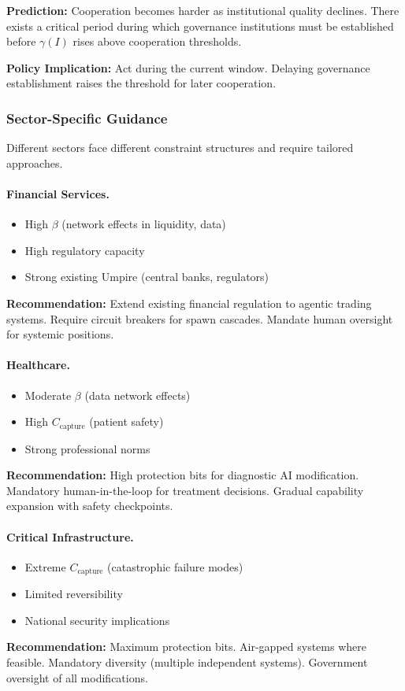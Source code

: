 \documentclass[12pt]{article}
\begin{document}
\textbf{Prediction:} Cooperation becomes harder as institutional quality declines. There exists a critical period during which governance institutions must be established before $\gamma(I)$ rises above cooperation thresholds.

\textbf{Policy Implication:} Act during the current window. Delaying governance establishment raises the threshold for later cooperation.

\subsubsection{Sector-Specific Guidance}

Different sectors face different constraint structures and require tailored approaches.

\paragraph{Financial Services.}
\begin{itemize}
    \item High $\beta$ (network effects in liquidity, data)
    \item High regulatory capacity
    \item Strong existing Umpire (central banks, regulators)
\end{itemize}
\textbf{Recommendation:} Extend existing financial regulation to agentic trading systems. Require circuit breakers for spawn cascades. Mandate human oversight for systemic positions.

\paragraph{Healthcare.}
\begin{itemize}
    \item Moderate $\beta$ (data network effects)
    \item High $C_{\text{capture}}$ (patient safety)
    \item Strong professional norms
\end{itemize}
\textbf{Recommendation:} High protection bits for diagnostic AI modification. Mandatory human-in-the-loop for treatment decisions. Gradual capability expansion with safety checkpoints.

\paragraph{Critical Infrastructure.}
\begin{itemize}
    \item Extreme $C_{\text{capture}}$ (catastrophic failure modes)
    \item Limited reversibility
    \item National security implications
\end{itemize}
\textbf{Recommendation:} Maximum protection bits. Air-gapped systems where feasible. Mandatory diversity (multiple independent systems). Government oversight of all modifications.
\end{document}

